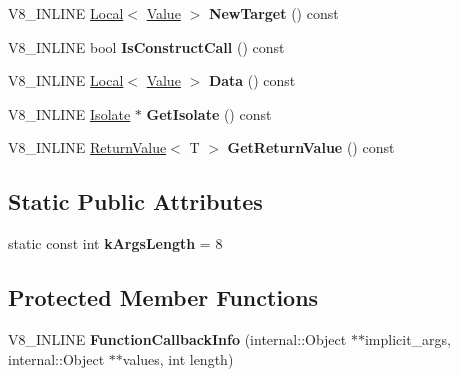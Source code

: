 \begin{DoxyCompactItemize}
\item 
V8\+\_\+\+I\+N\+L\+I\+NE \hyperlink{classv8_1_1_local}{Local}$<$ \hyperlink{classv8_1_1_value}{Value} $>$ {\bfseries New\+Target} () const \hypertarget{classv8_1_1_function_callback_info_a11cd0cd24b181bc6d39c3d0e203c2eee}{}\label{classv8_1_1_function_callback_info_a11cd0cd24b181bc6d39c3d0e203c2eee}

\item 
V8\+\_\+\+I\+N\+L\+I\+NE bool {\bfseries Is\+Construct\+Call} () const \hypertarget{classv8_1_1_function_callback_info_a8b89715c355b707efd3d2bcf21e64d9e}{}\label{classv8_1_1_function_callback_info_a8b89715c355b707efd3d2bcf21e64d9e}

\item 
V8\+\_\+\+I\+N\+L\+I\+NE \hyperlink{classv8_1_1_local}{Local}$<$ \hyperlink{classv8_1_1_value}{Value} $>$ {\bfseries Data} () const \hypertarget{classv8_1_1_function_callback_info_a1475dcc776c8fdd68eb1be08cd29e5ac}{}\label{classv8_1_1_function_callback_info_a1475dcc776c8fdd68eb1be08cd29e5ac}

\item 
V8\+\_\+\+I\+N\+L\+I\+NE \hyperlink{classv8_1_1_isolate}{Isolate} $\ast$ {\bfseries Get\+Isolate} () const \hypertarget{classv8_1_1_function_callback_info_a3b5fe01205c99dca06e388c3d390a40e}{}\label{classv8_1_1_function_callback_info_a3b5fe01205c99dca06e388c3d390a40e}

\item 
V8\+\_\+\+I\+N\+L\+I\+NE \hyperlink{classv8_1_1_return_value}{Return\+Value}$<$ T $>$ {\bfseries Get\+Return\+Value} () const \hypertarget{classv8_1_1_function_callback_info_abf851b51557b0507ab69c494fddbb3c3}{}\label{classv8_1_1_function_callback_info_abf851b51557b0507ab69c494fddbb3c3}

\end{DoxyCompactItemize}
\subsection*{Static Public Attributes}
\begin{DoxyCompactItemize}
\item 
static const int {\bfseries k\+Args\+Length} = 8\hypertarget{classv8_1_1_function_callback_info_a1e5248c2d40840270829882feaaa9d34}{}\label{classv8_1_1_function_callback_info_a1e5248c2d40840270829882feaaa9d34}

\end{DoxyCompactItemize}
\subsection*{Protected Member Functions}
\begin{DoxyCompactItemize}
\item 
V8\+\_\+\+I\+N\+L\+I\+NE {\bfseries Function\+Callback\+Info} (internal\+::\+Object $\ast$$\ast$implicit\+\_\+args, internal\+::\+Object $\ast$$\ast$values, int length)\hypertarget{classv8_1_1_function_callback_info_ad479ef760ed88d4354c267d2068deaca}{}\label{classv8_1_1_function_callback_info_ad479ef760ed88d4354c267d2068deaca}

\end{DoxyCompactItemize}
